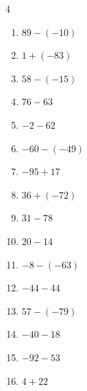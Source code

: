 \begin{multicols}{4}
\begin{enumerate}
        \phantom{$=27$}

  \item $89-(-10)$

        \phantom{$=99$}

  \item $1+(-83)$

        \phantom{$=-82$}

  \item $58-(-15)$

        \phantom{$=73$}

  \item $76-63$

        \phantom{$=13$}

  \item $-2-62$

        \phantom{$=-64$}

  \item $-60-(-49)$

        \phantom{$=-11$}

  \item $-95+17$

        \phantom{$=-78$}

  \item $36+(-72)$

        \phantom{$=-36$}

  \item $31-78$

        \phantom{$=-47$}

  \item $20-14$

        \phantom{$=6$}

  \item $-8-(-63)$

        \phantom{$=55$}

  \item $-44-44$

        \phantom{$=-88$}

  \item $57-(-79)$

        \phantom{$=136$}

  \item $-40-18$

        \phantom{$=-58$}

  \item $-92-53$

        \phantom{$=-145$}

  \item $4+22$


\end{enumerate}
\end{multicols}
